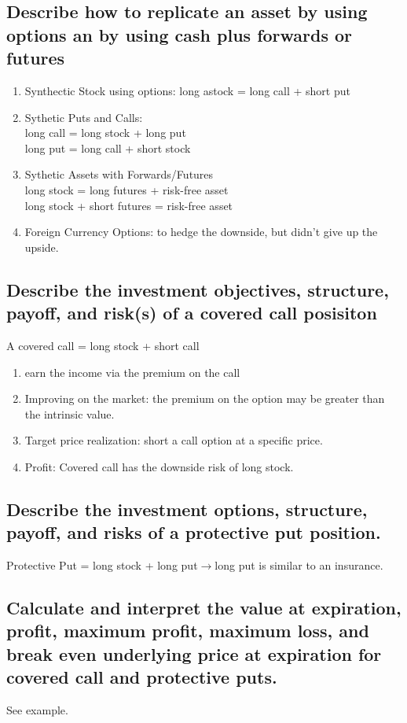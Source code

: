 \documentclass{article}
\newcommand{\be}{\begin{enumerate}}
\newcommand{\ee}{\end{enumerate}}
\newcommand{\ra}{$\rightarrow$}
\begin{document}
\subsection{Describe how to replicate an asset by using options an by using
cash plus forwards or futures}
\be
    \item Synthectic Stock using options: long astock = long call + short put
    \item Sythetic Puts and Calls: 
        \\long call = long stock + long put
        \\long put = long call + short stock
    \item Sythetic Assets with Forwards/Futures
        \\long stock = long futures + risk-free asset
        \\long stock + short futures = risk-free asset
    \item Foreign Currency Options: to hedge the downside, but didn't give up the 
    upside.
\ee
\subsection{Describe the investment objectives, structure, payoff, and risk(s) of
a covered call posisiton}
A covered call = long stock + short call
\be
    \item earn the income via the premium on the call
    \item Improving on the market: the premium on the option may be greater than
    the intrinsic value.
    \item Target price realization: short a call option at a specific price.
    \item Profit: Covered call has the downside risk of long stock.
\ee
\subsection{Describe the investment options, structure, payoff, and risks of a
protective put position.}
Protective Put = long stock + long put\ra long put is similar to an insurance.

\subsection{Calculate and interpret the value at expiration, profit, maximum profit,
maximum loss, and break even underlying price at expiration for covered call and 
protective puts.}
See example.
\end{document}
